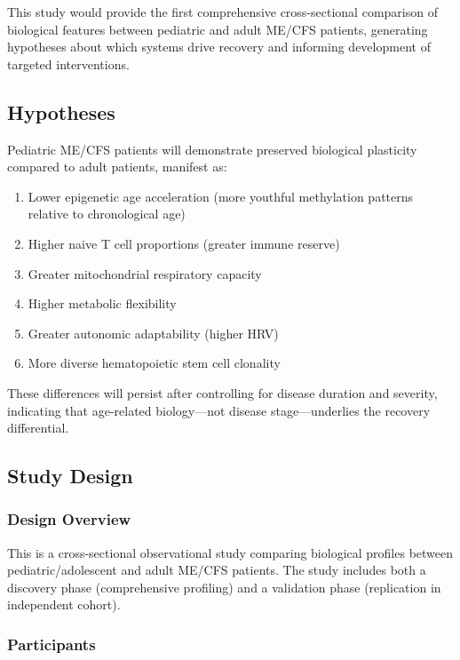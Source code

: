 This study would provide the first comprehensive cross-sectional comparison of biological features between pediatric and adult ME/CFS patients, generating hypotheses about which systems drive recovery and informing development of targeted interventions.

\subsection{Hypotheses}

\begin{hypothesis}
\label{hyp:plasticity-differential}
Pediatric ME/CFS patients will demonstrate preserved biological plasticity compared to adult patients, manifest as:
\begin{enumerate}
    \item Lower epigenetic age acceleration (more youthful methylation patterns relative to chronological age)
    \item Higher naive T cell proportions (greater immune reserve)
    \item Greater mitochondrial respiratory capacity
    \item Higher metabolic flexibility
    \item Greater autonomic adaptability (higher HRV)
    \item More diverse hematopoietic stem cell clonality
\end{enumerate}
These differences will persist after controlling for disease duration and severity, indicating that age-related biology---not disease stage---underlies the recovery differential.
\end{hypothesis}

\subsection{Study Design}

\subsubsection{Design Overview}
This is a cross-sectional observational study comparing biological profiles between pediatric/adolescent and adult ME/CFS patients. The study includes both a discovery phase (comprehensive profiling) and a validation phase (replication in independent cohort).

\subsubsection{Participants}

